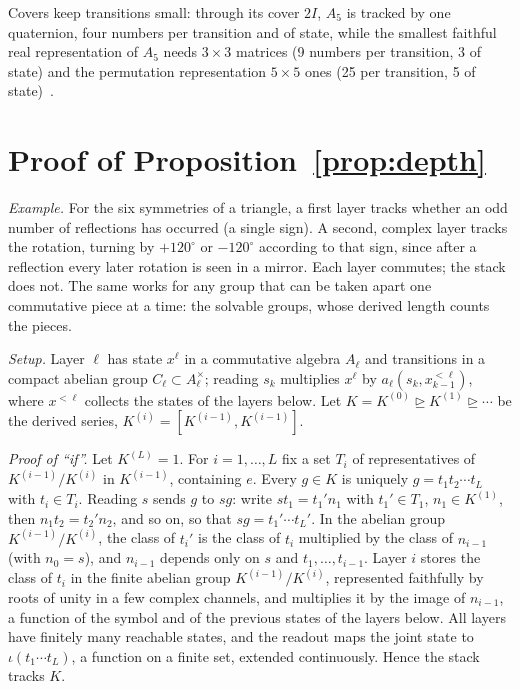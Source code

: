 \documentclass[aps,prx,reprint,superscriptaddress,longbibliography,nofootinbib,floatfix]{revtex4-2}
\theoremstyle{plain}
\theoremstyle{definition}
\begin{document}
Covers keep transitions small: through its cover $2I$, $A_5$ is tracked by
one quaternion, four numbers per transition and of state, while the smallest
faithful real representation of
$A_5$ needs $3\times3$ matrices (9 numbers per transition, 3 of state) and
the permutation representation $5\times5$ ones (25 per transition, 5 of
state)~\cite{pdssm}.

\section{Proof of Proposition~\ref{prop:depth}}\label{sm:depth}

\emph{Example.} For the six symmetries of a triangle, a first layer tracks
whether an odd number of reflections has occurred (a single sign). A second,
complex layer tracks the rotation, turning by $+120^\circ$ or $-120^\circ$
according to that sign, since after a reflection every later rotation is
seen in a mirror. Each layer commutes; the stack does not. The same works for
any group that can be taken apart one commutative piece at a time: the
solvable groups, whose derived length counts the pieces.

\emph{Setup.} Layer $\ell$ has state $x^\ell$ in a commutative algebra
$A_\ell$ and transitions in a compact abelian group $C_\ell\subset
A_\ell^\times$; reading $s_k$ multiplies $x^\ell$ by
$a_\ell(s_k,x^{<\ell}_{k-1})$, where $x^{<\ell}$ collects the states of the
layers below. Let $K=K^{(0)}\trianglerighteq K^{(1)}\trianglerighteq\cdots$
be the derived series, $K^{(i)}=[K^{(i-1)},K^{(i-1)}]$.

\emph{Proof of ``if''.} Let $K^{(L)}=1$. For $i=1,\dots,L$ fix a set $T_i$
of representatives of $K^{(i-1)}/K^{(i)}$ in $K^{(i-1)}$, containing $e$.
Every $g\in K$ is uniquely $g=t_1t_2\cdots t_L$ with $t_i\in T_i$. Reading
$s$ sends $g$ to $sg$: write $st_1=t_1'n_1$ with $t_1'\in T_1$,
$n_1\in K^{(1)}$, then $n_1t_2=t_2'n_2$, and so on, so that
$sg=t_1'\cdots t_L'$. In the abelian group $K^{(i-1)}/K^{(i)}$, the class of
$t_i'$ is the class of $t_i$ multiplied by the class of $n_{i-1}$ (with
$n_0=s$), and $n_{i-1}$ depends only on $s$ and $t_1,\dots,t_{i-1}$. Layer
$i$ stores the class of $t_i$ in the finite abelian group
$K^{(i-1)}/K^{(i)}$, represented faithfully by roots of unity in a few
complex channels, and multiplies it by the image of $n_{i-1}$, a function of
the symbol and of the previous states of the layers below. All layers have
finitely many reachable states, and the readout maps the joint state to
$\iota(t_1\cdots t_L)$, a function on a finite set, extended continuously.
Hence the stack tracks $K$.
\end{document}
